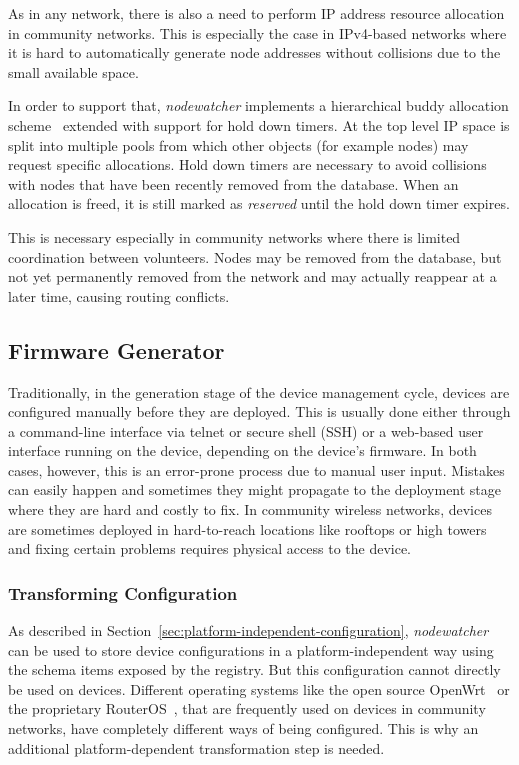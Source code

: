 \documentclass[5p,sort&compress]{elsarticle}
\newcommand{\nodewatcher}{\textit{nodewatcher}}
\begin{document}
As in any network, there is also a need to perform IP address resource allocation in community networks.
This is especially the case in IPv4-based networks where it is hard to automatically generate node addresses without collisions due to the small available space.

In order to support that, \nodewatcher{} implements a hierarchical buddy allocation scheme~\cite{Peterson_1977} extended with support for hold down timers.
At the top level IP space is split into multiple pools from which other objects (for example nodes) may request specific allocations.
Hold down timers are necessary to avoid collisions with nodes that have been recently removed from the database.
When an allocation is freed, it is still marked as \textit{reserved} until the hold down timer expires.

This is necessary especially in community networks where there is limited coordination between volunteers.
Nodes may be removed from the database, but not yet permanently removed from the network and may actually reappear at a later time, causing routing conflicts.

\subsection{Firmware Generator}
\label{sec:firmware-generator}

Traditionally, in the generation stage of the device management cycle, devices are configured manually before they are deployed.
This is usually done either through a command-line interface via telnet or secure shell (SSH) or a web-based user interface running on the device, depending on the device's firmware.
In both cases, however, this is an error-prone process due to manual user input.
Mistakes can easily happen and sometimes they might propagate to the deployment stage where they are hard and costly to fix.
In community wireless networks, devices are sometimes deployed in hard-to-reach locations like rooftops or high towers and fixing certain problems requires physical access to the device.

\subsubsection{Transforming Configuration}

As described in Section~\ref{sec:platform-independent-configuration}, \nodewatcher{} can be used to store device configurations in a platform-independent way using the schema items exposed by the registry.
But this configuration cannot directly be used on devices.
Different operating systems like the open source OpenWrt~\cite{OpenWrt_2004} or the proprietary RouterOS~\cite{RouterOS_1995}, that are frequently used on devices in community networks, have completely different ways of being configured.
This is why an additional platform-dependent transformation step is needed.
\end{document}
